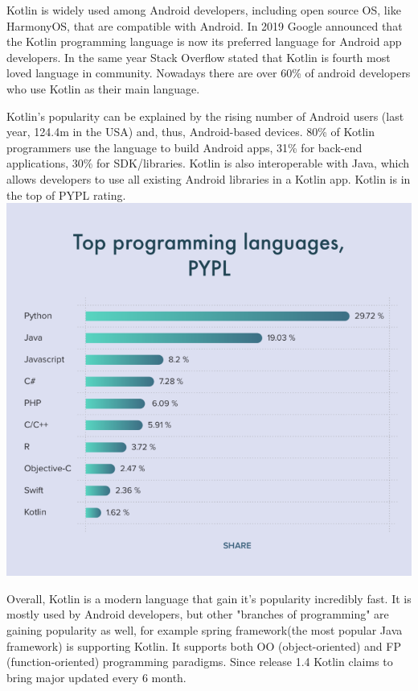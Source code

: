 Kotlin is widely used among Android developers, including open source OS, like HarmonyOS, that are compatible with Android. In 2019 Google announced that the Kotlin programming language is now its preferred language for Android app developers. In the same year Stack Overflow stated that Kotlin is fourth most loved language in community. Nowadays there are over 60\% of android developers who use Kotlin as their main language. 
\par Kotlin's popularity can be explained by the rising number of Android users (last year, 124.4m in the USA) and, thus, Android-based devices. 80\% of Kotlin programmers use the language to build Android apps, 31\% for back-end applications, 30\% for SDK/libraries.
Kotlin is also interoperable with Java, which allows developers to use all existing Android libraries in a Kotlin app. Kotlin is in the top of PYPL rating.
\newline
\includegraphics[scale =0.65]{pictures/kotlinRating.png}
\newline
\par Overall, Kotlin is a modern language that gain it's popularity incredibly fast. It is mostly used by Android developers, but other "branches of programming" are gaining popularity as well, for example spring framework(the most popular Java framework) is supporting Kotlin. It supports both OO (object-oriented) and FP (function-oriented) programming paradigms. Since release 1.4 Kotlin claims to bring major updated every 6 month.
